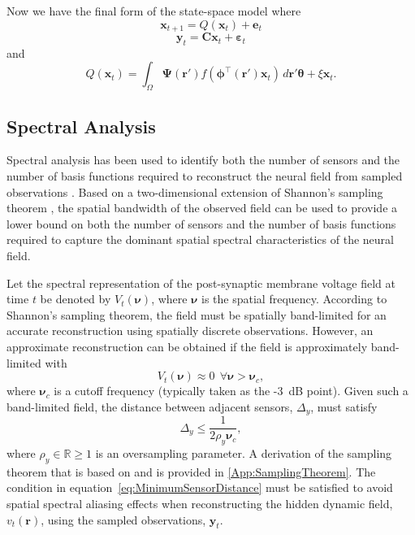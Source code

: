 \documentclass[review,authoryear,3p]{elsarticle}
\begin{document}
Now we have the final form of the state-space model where
\begin{equation}\label{eq:finalformstatespacemodel}
	\mathbf{x}_{t+1} = Q(\mathbf{x}_t) +\mathbf{e}_t
\end{equation}
\begin{equation} 
	\mathbf{y}_t = \mathbf{C}\mathbf{x}_t + \boldsymbol{\varepsilon}_t
\end{equation}
and 
\begin{equation}\label{eq:QmatrixForSigmapoints}
	Q(\mathbf{x}_t) = \int_\Omega \boldsymbol{\Psi}(\mathbf{r}') f(\boldsymbol{\phi}^{\top}(\mathbf{r}')\mathbf{x}_t) \, d\mathbf{r}' \boldsymbol{\theta} + \xi\mathbf{x}_t.
\end{equation}

\subsection{Spectral Analysis}\label{SpectralAnalysisSection} 
Spectral analysis has been used to identify both the number of sensors and the number of basis functions required to reconstruct the neural field from sampled observations \citep{Sanner1992,Scerri2009}. Based on a two-dimensional extension of Shannon's sampling theorem \citep{Peterson1962}, the spatial bandwidth of the observed field can be used to provide a lower bound on both the number of sensors and the number of basis functions required to capture the dominant spatial spectral characteristics of the neural field.

Let the spectral representation of the post-synaptic membrane voltage field at time $t$ be denoted by $V_t(\boldsymbol{\nu})$, where $\boldsymbol\nu$ is the spatial frequency. According to Shannon's sampling theorem, the field must be spatially band-limited for an accurate reconstruction using spatially discrete observations. However, an approximate reconstruction can be obtained if the field is approximately band-limited with 
\begin{equation}
	V_t(\boldsymbol{\nu}) \approx 0 ~ \ \forall \boldsymbol{\nu} > \boldsymbol{\nu}_c,
\end{equation}
where $\boldsymbol{\nu}_c$ is a cutoff frequency (typically taken as the -3~dB point). Given such a band-limited field, the distance between adjacent sensors, $\Delta_y$, must satisfy 
\begin{equation}
	\label{eq:MinimumSensorDistance} \Delta_y \leq \frac{1}{2\rho_y\boldsymbol{\nu}_{c}}, 
\end{equation}
where $\rho_y \in \mathbb{R} \ge 1$ is an oversampling parameter. A derivation of the sampling theorem that is based on \citet{Sanner1992} and \citet{Scerri2009} is provided in \ref{App:SamplingTheorem}. The condition in equation~\ref{eq:MinimumSensorDistance} must be satisfied to avoid spatial spectral aliasing effects when reconstructing the hidden dynamic field, $v_t(\mathbf{r})$, using the sampled observations, $\mathbf{y}_t$.
\end{document}
